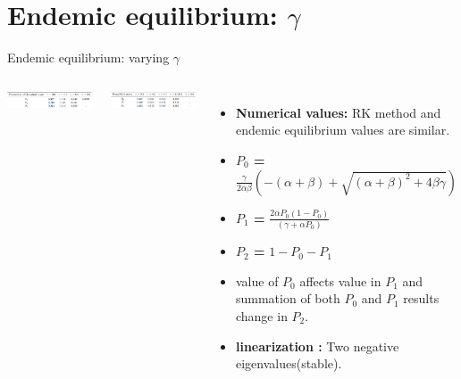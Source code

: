 \documentclass[smaller,aspectratio=169, toc=bibliography]{beamer}
\begin{document}
\section*{Endemic equilibrium: $\gamma$ }

\begin{frame}{Endemic equilibrium: varying $\gamma$}
\begin{columns}[c]
            \begin{center}
                \includegraphics[width=\linewidth]{screenshot/12gammaRK_PK.png}
                \caption{Runge-Kutta Method : $\gamma$}
            \end{center}
             \begin{center}
                \includegraphics[width=\linewidth]{screenshot/15gammaEE_PK.png}
                \caption{Equilibrium: $\gamma$}
            \end{center}
            \begin{itemize}
            \item \textbf{Numerical values: } RK method and endemic equilibrium values are similar.
\item \textbf{$P_0$ = } \( \frac{\gamma}{2\alpha\beta}(-( \alpha + \beta ) + \sqrt{( \alpha + \beta )^2 + 4\beta\gamma}) \)
\item \textbf{$P_1$ = } \( \frac{2\alpha P_0(1 - P_0)}{(\gamma + \alpha P_0 )}\) 
\item \textbf{$P_2$ = } $1 - P_0 - P_1$ 
\item value of $P_0$ affects value in $P_1$ and summation of both $P_0$ and $P_1$ results change in $P_2$. 
\item \textbf{linearization : } Two negative eigenvalues(stable).
\end{itemize}
\end{columns}
\end{frame}
\end{document}
